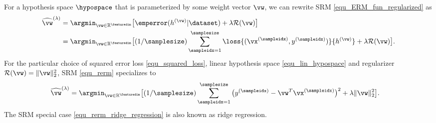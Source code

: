 \documentclass[12pt]{report}
\newcommand{\featurelen}{\featuredim}
\begin{document}
For a hypothesis space $\hypospace$ that is parameterized by some weight vector $\vw$, 
we can rewrite SRM \eqref{equ_ERM_fun_regularized} as 
\begin{align} 
\label{equ_rerm}
\widehat{\vw}^{(\lambda)}  & = \argmin_{\vw \in  \mathbb{R}^{\featurelen}} \big[ \emperror(h^{(\vw)}|\dataset)+ \lambda \mathcal{R}(\vw)\big] \nonumber \\ %
&  = \argmin_{\vw \in  \mathbb{R}^{\featurelen}} \big[(1/\samplesize) \sum_{\sampleidx=1}^{\samplesize} \loss{(\vx^{(\sampleidx)},y^{(\sampleidx)})}{h^{(\vw)}} + \lambda \mathcal{R}(\vw) \big]. 
\end{align}
For the particular choice of squared error loss \eqref{equ_squared_loss}, linear hypothesis space \eqref{equ_lin_hypospace} 
and regularizer $\mathcal{R}(\vw)=\| \vw \|_{2}^{2}$, SRM \eqref{equ_rerm} specializes to 
\begin{align} 
\label{equ_rerm_ridge_regression}
\widehat{\vw}^{(\lambda)}  & = \argmin_{\vw \in  \mathbb{R}^{\featurelen}} \big[(1/\samplesize) \sum_{\sampleidx=1}^{\samplesize} \big( y^{(\sampleidx)} - \vw^{T} \vx^{(\sampleidx)}\big)^{2} + \lambda \| \vw \|_{2}^{2}\big]. 
\end{align}
The SRM special case \eqref{equ_rerm_ridge_regression} is also known as ridge regression. 





%


\end{document}
